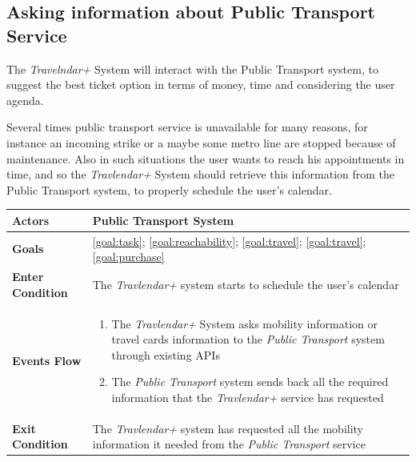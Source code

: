\subsection{Asking information about Public Transport Service}
The \emph{Travelndar+} System will interact with the Public Transport system, to suggest the best ticket option in terms of money, time and considering the user agenda.

Several times public transport service is unavailable for many reasons, for instance an incoming strike or a maybe some metro line are stopped because of maintenance. Also in such situations the user wants to reach his appointments in time, and so the \emph{Travlendar+} System should retrieve this information from the Public Transport system, to properly schedule the user's calendar. 

\begin{table}[H]
	\centering
    
    \begin{tabular}{|p{3.5cm}|p{10.3cm}|}
    
    \hline
    \textbf{\large{Actors}}  			& \tabitem Public Transport System\\
    
    \hline
    \textbf{\large{Goals}} 				& \ref{goal:task}; \ref{goal:reachability}; \ref{goal:travel}; \ref{goal:travel}; \ref{goal:purchase} \\
    
    \hline
    \textbf{\large{Enter Condition}}	& The \emph{Travlendar+} system starts to schedule the user's calendar\\
    
    \hline
    \textbf{\large{Events Flow}}		& \begin{enumerate}[leftmargin=0.5cm]
                                          	\item The \emph{Travlendar+} System asks mobility information or travel cards information to the \emph{Public Transport} system through existing APIs
                                          	\item The \emph{Public Transport} system sends back all the required information that the \emph{Travlendar+} service has requested
                                          \end{enumerate}
    										\\
    \hline
    \textbf{\large{Exit Condition}} 	& The \emph{Travlendar+} system has requested all the mobility information it needed from the \emph{Public Transport} service\\
    

\end{tabular}
\end{table}
